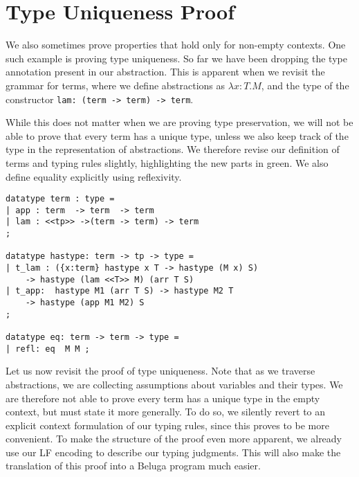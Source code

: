 





\section{Type Uniqueness Proof}
We also sometimes prove properties that hold only for non-empty
contexts. One such example is proving type uniqueness. So far we have
been dropping the type annotation present in our abstraction. This is
apparent when we revisit the grammar for terms, where we define
abstractions as $\lambda x{:}T.M$, and the type of the constructor
\lstinline!lam: (term -> term) -> term!. 

While this does not matter when we are proving type preservation, we
will not be able to prove that every term has a unique type, unless we
also keep track of the type in the representation of abstractions. We
therefore revise our definition of terms and typing rules slightly,
highlighting the new parts in green. We also define equality
explicitly using reflexivity.

\begin{lstlisting}
datatype term : type = 
| app : term  -> term  -> term
| lam : <<tp>> ->(term -> term) -> term
;

datatype hastype: term -> tp -> type =
| t_lam : ({x:term} hastype x T -> hastype (M x) S)
	-> hastype (lam <<T>> M) (arr T S)
| t_app:  hastype M1 (arr T S) -> hastype M2 T
	-> hastype (app M1 M2) S
;  

datatype eq: term -> term -> type =
| refl: eq  M M ;
\end{lstlisting}

Let us now revisit the proof of type uniqueness. Note that as we traverse
abstractions, we are collecting assumptions about variables and their
types. We are therefore not able to prove every term has a unique type
in the empty context, but must state it more generally. To do so, we
silently revert to an explicit context formulation of our typing
rules, since this proves to be more convenient. To make the structure
of the proof even more apparent, we already use our LF encoding to
describe our typing judgments. This will also make the translation of
this proof into a Beluga program much easier.

